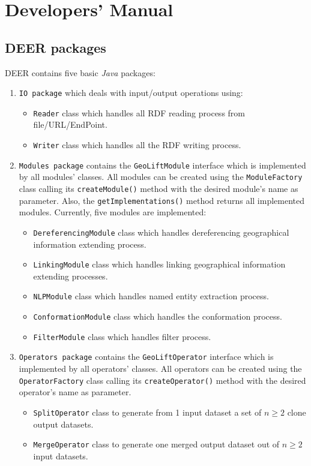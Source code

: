 \documentclass[a4paper,twoside,bibtotoc,abstracton,12pt,BCOR=15mm]{article}
\newcommand{\geolift}{\textsc{DEER}\xspace}
\begin{document}
\section{Developers' Manual}

\subsection{\geolift packages}
\geolift contains five basic \emph{Java} packages: 
\begin{enumerate}
 \item \texttt{IO package} which deals with input/output operations using:
   \begin{itemize}
    \item \texttt{Reader} class which handles all RDF reading process from file/URL/EndPoint. 
    \item \texttt{Writer} class which handles all the RDF writing process. 
  \end{itemize}

  \item\texttt{Modules package} contains the \texttt{GeoLiftModule} interface which is implemented by all modules' classes.
      All modules can be created using the \texttt{ModuleFactory} class calling its \texttt{createModule()} method with the desired module's name as parameter.
      Also, the \texttt{getImplementations()} method returns all implemented modules.
      Currently, five modules are implemented:
      \begin{itemize}
	\item \texttt{DereferencingModule} class which handles dereferencing  geographical information extending process. 
	\item \texttt{LinkingModule} class which handles linking geographical information extending processes. 
	\item \texttt{NLPModule} class which handles named entity extraction process.
	\item \texttt{ConformationModule} class which handles the conformation process.
	\item \texttt{FilterModule} class which handles filter process.
      \end{itemize}
  
   \item \texttt{Operators package} contains the \texttt{GeoLiftOperator} interface which is implemented by all operators' classes.
    All operators can be created using the \texttt{OperatorFactory} class calling its \texttt{createOperator()} method with the desired operator's name as parameter.
      \begin{itemize}
	\item \texttt{SplitOperator} class to generate from 1 input dataset a set of $n \geq 2$ clone output datasets.
	\item \texttt{MergeOperator} class to generate one merged output dataset out of $n \geq 2$ input datasets.
      \end{itemize}
 

\end{enumerate}
\end{document}
